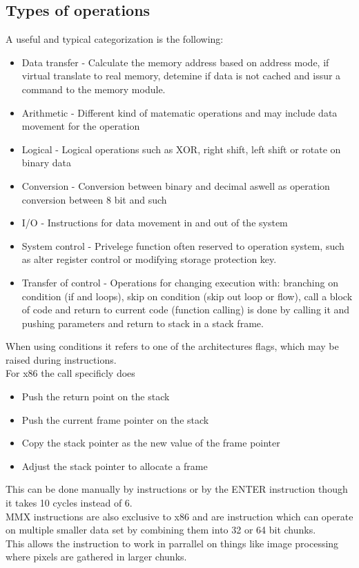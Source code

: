 \documentclass[12pt, a4paper]{article}
\begin{document}
		\subsection{Types of operations}
			A useful and typical categorization is the following: 
			\begin{itemize}
				\item Data transfer - Calculate the memory address based on address mode, if virtual translate to real memory, detemine if data is not cached and issur a command to the memory module.
				\item Arithmetic - Different kind of matematic operations and may include data movement for the operation
				\item Logical - Logical operations such as XOR, right shift, left shift or rotate on binary data
				\item Conversion - Conversion between binary and decimal aswell as operation conversion between 8 bit and such
				\item I/O - Instructions for data movement in and out of the system
				\item System control - Privelege function often reserved to operation system, such as alter register control or modifying storage protection key.
				\item Transfer of control - Operations for changing execution with: branching on condition (if and loops), skip on condition (skip out loop or flow), call a block of code and return to current code (function calling) is done by calling it and pushing parameters and return to stack in a stack frame. 
			\end{itemize}
			When using conditions it refers to one of the architectures flags, which may be raised during instructions.\\
			For x86 the call specificly does
			\begin{itemize}
				\item Push the return point on the stack
				\item Push the current frame pointer on the stack
				\item Copy the stack pointer as the new value of the frame pointer
				\item Adjust the stack pointer to allocate a frame
			\end{itemize}
			This can be done manually by instructions or by the ENTER instruction though it takes 10 cycles instead of 6.\\
			MMX instructions are also exclusive to x86 and are instruction which can operate on multiple smaller data set by combining them into 32 or 64 bit chunks.\\
			This allows the instruction to work in parrallel on things like image processing where pixels are gathered in larger chunks.\\
			
\end{document}
